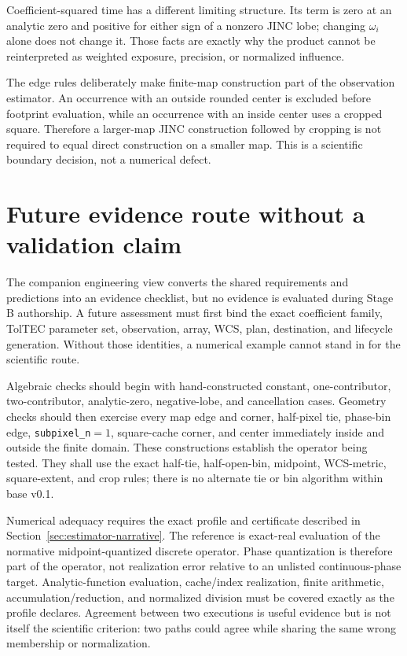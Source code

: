 \documentclass[11pt]{article}
\begin{document}
Coefficient-squared time has a different limiting structure.  Its term is
zero at an analytic zero and positive for either sign of a nonzero JINC lobe;
changing $\omega_i$ alone does not change it.  Those facts are exactly why the
product cannot be reinterpreted as weighted exposure, precision, or normalized
influence.

The edge rules deliberately make finite-map construction part of the
observation estimator.  An occurrence with an outside rounded center is
excluded before footprint evaluation, while an occurrence with an inside
center uses a cropped square.  Therefore a larger-map JINC construction
followed by cropping is not required to equal direct construction on a smaller
map.  This is a scientific boundary decision, not a numerical defect.

\section{Future evidence route without a validation claim}
\label{sec:future-evidence}

The companion engineering view converts the shared requirements and
predictions into an evidence checklist, but no evidence is evaluated during
Stage B authorship.  A future assessment must first bind the exact coefficient
family, TolTEC parameter set, observation, array, WCS, plan, destination, and
lifecycle generation.  Without those identities, a numerical example cannot
stand in for the scientific route.

Algebraic checks should begin with hand-constructed constant, one-contributor,
two-contributor, analytic-zero, negative-lobe, and cancellation cases.  Geometry
checks should then exercise every map edge and corner, half-pixel tie, phase-bin
edge, \texttt{subpixel\_n}$=1$, square-cache corner, and center immediately
inside and outside the finite domain.  These constructions establish the
operator being tested.  They shall use the exact half-tie, half-open-bin,
midpoint, WCS-metric, square-extent, and crop rules; there is no alternate tie
or bin algorithm within base v0.1.

Numerical adequacy requires the exact profile and certificate described in
Section~\ref{sec:estimator-narrative}.  The reference is exact-real evaluation
of the normative midpoint-quantized discrete operator.  Phase quantization is
therefore part of the operator, not realization error relative to an unlisted
continuous-phase target.  Analytic-function evaluation, cache/index
realization, finite arithmetic, accumulation/reduction, and normalized
division must be covered exactly as the profile declares.  Agreement between
two executions is useful evidence but is not itself the scientific criterion:
two paths could agree while sharing the same wrong membership or normalization.
\end{document}
